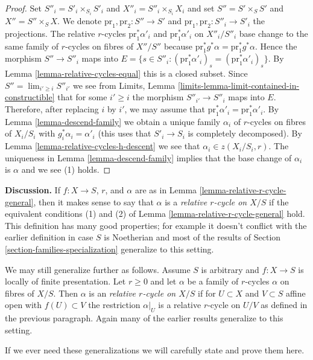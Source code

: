 \begin{proof}
\medskip\noindent
Set $S''_i = S'_i \times_{S_i} S'_i$ and $X''_i = S''_i \times_{S_i} X_i$
and set $S'' = S' \times_S S'$ and $X'' = S'' \times_S X$.
We denote $\text{pr}_1, \text{pr}_2 : S'' \to S'$ and
$\text{pr}_1, \text{pr}_2 : S''_i \to S'_i$ the projections.
The relative $r$-cycles $\text{pr}_1^*\alpha'_i$ and $\text{pr}_1^*\alpha'_i$
on $X''_i/S''_i$ base change to the same family of $r$-cycles
on fibres of $X''/S''$ because
$\text{pr}_1^*g^*\alpha = \text{pr}_1^*g^*\alpha$.
Hence the morphism $S'' \to S''_i$ maps into $E =
\{s \in S''_i : (\text{pr}_1^*\alpha'_i)_s = (\text{pr}_1^*\alpha'_i)_s\}$.
By Lemma \ref{lemma-relative-cycles-equal} this is a closed subset.
Since $S'' = \lim_{i' \geq i} S''_{i'}$ we see from
Limits, Lemma
\ref{limits-lemma-limit-contained-in-constructible}
that for some $i' \geq i$ the morphism $S''_{i'} \to S''_i$
maps into $E$. Therefore, after replacing $i$ by $i'$, we may assume that
$\text{pr}_1^*\alpha'_i = \text{pr}_1^*\alpha'_i$.
By Lemma \ref{lemma-descend-family}
we obtain a unique family $\alpha_i$
of $r$-cycles on fibres of $X_i/S_i$
with $g_i^*\alpha_i = \alpha'_i$ (this uses that $S'_i \to S_i$
is completely decomposed).
By Lemma \ref{lemma-relative-cycles-h-descent}
we see that $\alpha_i \in z(X_i/S_i, r)$.
The uniqueness in Lemma \ref{lemma-descend-family} implies that the
base change of $\alpha_i$ is $\alpha$ and we see (1) holds.
\end{proof}

\noindent
{\bf Discussion.}
If $f : X \to S$, $r$, and $\alpha$ are as in
Lemma \ref{lemma-relative-r-cycle-general}, then it makes sense to
say that $\alpha$ is a {\it relative $r$-cycle on $X/S$} if
the equivalent conditions
(1) and (2) of Lemma \ref{lemma-relative-r-cycle-general} hold.
This definition has many good properties; for example it
doesn't conflict with the earlier definition in case $S$
is Noetherian and most of the results of
Section \ref{section-families-specialization} generalize
to this setting.

\medskip\noindent
We may still generalize further as follows.
Assume $S$ is arbitrary and $f : X \to S$ is locally of finite presentation.
Let $r \geq 0$ and let $\alpha$ be a family of $r$-cycles $\alpha$ on fibres of
$X/S$. Then $\alpha$ is an {\it relative $r$-cycle on $X/S$} if
for $U \subset X$ and $V \subset S$ affine open with $f(U) \subset V$
the restriction $\alpha|_U$ is a relative $r$-cycle on $U/V$ as
defined in the previous paragraph. Again many of the earlier results
generalize to this setting.

\medskip\noindent
If we ever need these generalizations we will carefully state and prove
them here.

























